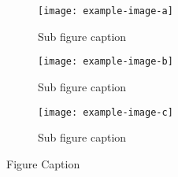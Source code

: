 \begin{figure}
     \centering
     \begin{subfigure}[b]{0.32\textwidth}
         \centering
         \texttt{[image: example-image-a]}
         \caption{Sub figure caption}
     \end{subfigure}
     \hfill
     \begin{subfigure}[b]{0.32\textwidth}
         \centering
         \texttt{[image: example-image-b]}
         \caption{Sub figure caption}
     \end{subfigure}
     \hfill
     \begin{subfigure}[b]{0.32\textwidth}
         \centering
         \texttt{[image: example-image-c]}
         \caption{Sub figure caption}
     \end{subfigure}
     \caption{Figure Caption}
\end{figure}
